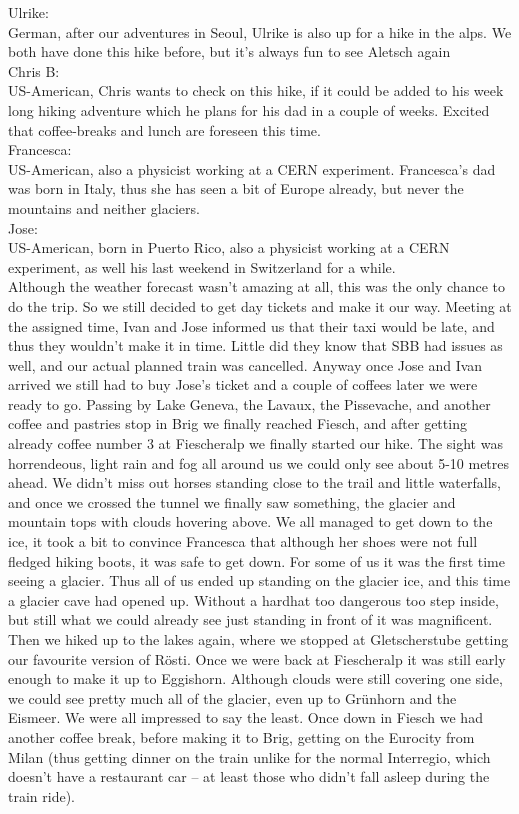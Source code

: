 Ulrike:\\
German, after our adventures in Seoul, Ulrike is also up for a hike in the alps. We both have done this hike before, but it's always fun to see Aletsch again\\

Chris B:\\
US-American, Chris wants to check on this hike, if it could be added to his week long hiking adventure which he plans for his dad in a couple of weeks. Excited that coffee-breaks and lunch are foreseen this time.\\

Francesca:\\
US-American, also a physicist working at a CERN experiment. Francesca's dad was born in Italy, thus she has seen a bit of Europe already, but never the mountains and neither glaciers.\\

Jose:\\
US-American, born in Puerto Rico, also a physicist working at a CERN experiment, as well his last weekend in Switzerland for a while.\\

Although the weather forecast wasn't amazing at all, this was the only chance to do the trip. So we still decided to get day tickets and make it our way. Meeting at the assigned time, Ivan and Jose informed us that their taxi would be late, and thus they wouldn't make it in time. Little did they know that SBB had issues as well, and our actual planned train was cancelled. Anyway once Jose and Ivan arrived we still had to buy Jose's ticket and a couple of coffees later we were ready to go. Passing by Lake Geneva, the Lavaux, the Pissevache, and another coffee and pastries stop in Brig we finally reached Fiesch, and after getting already coffee number 3 at Fiescheralp we finally started our hike. The sight was horrendeous, light rain and fog all around us we could only see about 5-10 metres ahead. We didn't miss out horses standing close to the trail and little waterfalls, and once we crossed the tunnel we finally saw something, the glacier and mountain tops with clouds hovering above. We all managed to get down to the ice, it took a bit to convince Francesca that although her shoes were not full fledged hiking boots, it was safe to get down. For some of us it was the first time seeing a glacier. Thus all of us ended up standing on the glacier ice, and this time a glacier cave had opened up. Without a hardhat too dangerous too step inside, but still what we could already see just standing in front of it was magnificent. Then we hiked up to the lakes again, where we stopped at Gletscherstube getting our favourite version of R\"osti. Once we were back at Fiescheralp it was still early enough to make it up to Eggishorn. Although clouds were still covering one side, we could see pretty much all of the glacier, even up to Gr\"unhorn and the Eismeer. We were all impressed to say the least. Once down in Fiesch we had another coffee break, before making it to Brig, getting on the Eurocity from Milan (thus getting dinner on the train unlike for the normal Interregio, which doesn't have a restaurant car -- at least those who didn't fall asleep during the train ride).\\


